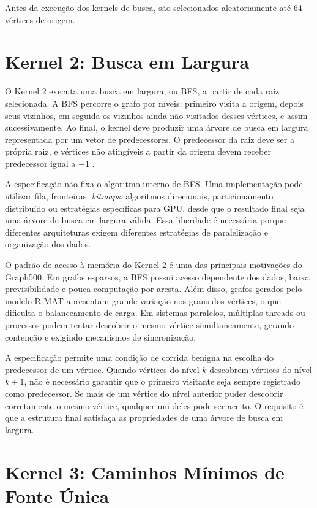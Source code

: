 Antes da execução dos kernels de busca, são selecionados aleatoriamente até 64 vértices de origem. 

\section{Kernel 2: Busca em Largura}
\label{sec:graph500-kernel2}

O Kernel 2 executa uma busca em largura, ou BFS, a partir de cada raiz selecionada. 
A BFS percorre o grafo por níveis: primeiro visita a origem, depois seus vizinhos, em seguida os vizinhos ainda não visitados desses vértices, e assim sucessivamente. 
Ao final, o kernel deve produzir uma árvore de busca em largura representada por um vetor de predecessores. 
O predecessor da raiz deve ser a própria raiz, e vértices não atingíveis a partir da origem devem receber predecessor igual a $-1$ \cite{graph500spec, cormenalgorithms}.

A especificação não fixa o algoritmo interno de BFS. Uma implementação pode utilizar fila, fronteiras, \textit{bitmaps}, algoritmos direcionais, particionamento distribuído ou estratégias específicas para GPU, desde que o resultado final seja uma árvore de busca em largura válida. Essa liberdade é necessária porque diferentes arquiteturas exigem diferentes estratégias de paralelização e organização dos dados.

O padrão de acesso à memória do Kernel 2 é uma das principais motivações do Graph500. Em grafos esparsos, a BFS possui acesso dependente dos dados, baixa previsibilidade e pouca computação por aresta. Além disso, grafos gerados pelo modelo R-MAT apresentam grande variação nos graus dos vértices, o que dificulta o balanceamento de carga. 
Em sistemas paralelos, múltiplas threads ou processos podem tentar descobrir o mesmo vértice simultaneamente, gerando contenção e exigindo mecanismos de sincronização.

A especificação permite uma condição de corrida benigna na escolha do predecessor de um vértice. Quando vértices do nível $k$ descobrem vértices do nível $k+1$, não é necessário garantir que o primeiro visitante seja sempre registrado como predecessor. Se mais de um vértice do nível anterior puder descobrir corretamente o mesmo vértice, qualquer um deles pode ser aceito. O requisito é que a estrutura final satisfaça as propriedades de uma árvore de busca em largura.

\section{Kernel 3: Caminhos Mínimos de Fonte Única}
\label{sec:graph500-kernel3}

